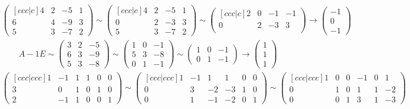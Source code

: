 \documentclass[]{article}
\begin{document}
\begin{align*}
    \begin{pmatrix}[ccc|c]
        4 & 2 & -5 & 1 \\
        6 & 4 & -9 & 3 \\
        5 & 3 & -7 & 2
    \end{pmatrix}
    \sim
    \begin{pmatrix}[ccc|c]
        4 & 2 & -5 & 1 \\
        0 & 2 & -3 & 3 \\
        5 & 3 & -7 & 2
    \end{pmatrix}
    \sim
    \begin{pmatrix}[ccc|c]
        2 & 0 & -1 & -1 \\
        0 & 2 & -3 &  3 \\
    \end{pmatrix}
    \rightarrow
    \begin{pmatrix}
        -1 \\ 0 \\ -1
    \end{pmatrix}
\end{align*}
\begin{align*}
    A - 1E \sim
    \begin{pmatrix}
        3 & 2 & -5 \\
        6 & 3 & -9 \\
        5 & 3 & -8
    \end{pmatrix}
    \sim
    \begin{pmatrix}
        1 & 0 & -1 \\
        5 & 3 & -8 \\
        0 & 1 & -1
    \end{pmatrix}
    \sim
    \begin{pmatrix}
        1 & 0 & -1 \\
        0 & 1 & -1
    \end{pmatrix}
    \rightarrow
    \begin{pmatrix}
        1 \\ 1 \\ 1
    \end{pmatrix}
\end{align*}
\begin{align*}
    \begin{pmatrix}[ccc|ccc]
        1 & -1 & 1  &  1 & 0 & 0 \\
        3 &  0 & 1  &  0 & 1 & 0 \\
        2 & -1 & 1  &  0 & 0 & 1
    \end{pmatrix}
    \sim
    \begin{pmatrix}[ccc|ccc]
        1 & -1 & 1 & 1 & 0 & 0 \\
        0 & 3 & -2 & -3 & 1 & 0 \\
        0 & 1 & -1 & -2 & 0 & 1
    \end{pmatrix}
    \sim
    \begin{pmatrix}[ccc|ccc]
        1 & 0 & 0 & -1 & 0 & 1 \\
        0 & 1 & 0 & 1 & 1 & -2 \\
        0 & 0 & 1 & 3 & 1 & -3
    \end{pmatrix}
\end{align*}
\end{document}
